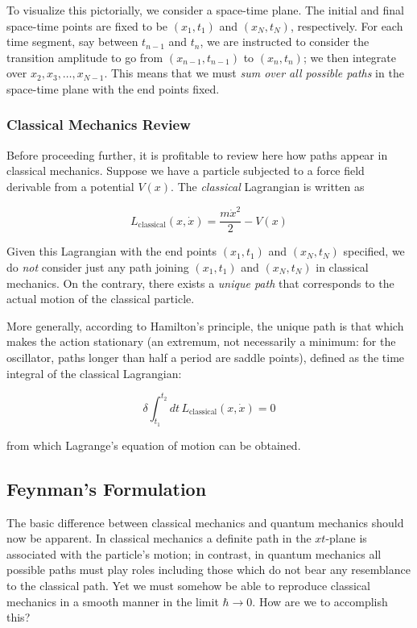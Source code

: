 \documentclass[11pt,a4paper]{article}
\begin{document}
To visualize this pictorially, we consider a space-time plane. The initial and final space-time points are fixed to be $(x_1, t_1)$ and $(x_N, t_N)$, respectively. For each time segment, say between $t_{n-1}$ and $t_n$, we are instructed to consider the transition amplitude to go from $(x_{n-1}, t_{n-1})$ to $(x_n, t_n)$; we then integrate over $x_2, x_3, \ldots, x_{N-1}$. This means that we must \textit{sum over all possible paths} in the space-time plane with the end points fixed.

\subsubsection{Classical Mechanics Review}

Before proceeding further, it is profitable to review here how paths appear in classical mechanics. Suppose we have a particle subjected to a force field derivable from a potential $V(x)$. The \textit{classical} Lagrangian is written as

\begin{equation}
L_{\text{classical}}(x, \dot{x}) = \frac{m\dot{x}^2}{2} - V(x)
\tag{2.296}
\end{equation}

Given this Lagrangian with the end points $(x_1, t_1)$ and $(x_N, t_N)$ specified, we do \textit{not} consider just any path joining $(x_1, t_1)$ and $(x_N, t_N)$ in classical mechanics. On the contrary, there exists a \textit{unique path} that corresponds to the actual motion of the classical particle.

More generally, according to Hamilton's principle, the unique path is that which makes the action stationary (an extremum, not necessarily a minimum: for the oscillator, paths longer than half a period are saddle points), defined as the time integral of the classical Lagrangian:

\begin{equation}
\delta\int_{t_1}^{t_2} dt\,L_{\text{classical}}(x, \dot{x}) = 0
\tag{2.299}
\end{equation}

from which Lagrange's equation of motion can be obtained.

\subsection{Feynman's Formulation}

The basic difference between classical mechanics and quantum mechanics should now be apparent. In classical mechanics a definite path in the $xt$-plane is associated with the particle's motion; in contrast, in quantum mechanics all possible paths must play roles including those which do not bear any resemblance to the classical path. Yet we must somehow be able to reproduce classical mechanics in a smooth manner in the limit $\hbar \to 0$. How are we to accomplish this?
\end{document}
